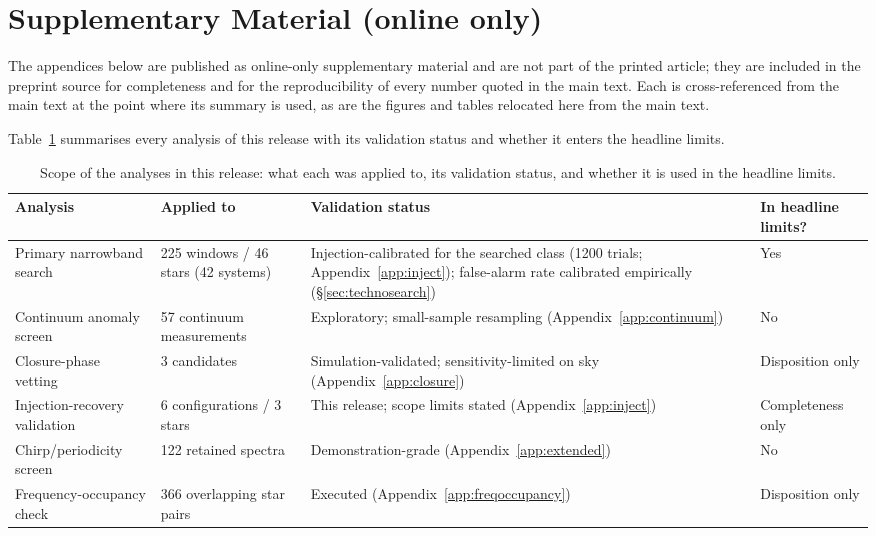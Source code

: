 \documentclass{openjournal}
\begin{document}
\clearpage
\section*{Supplementary Material (online only)}
\label{sec:supplementary}
The appendices below are published as online-only
supplementary material and are not part of the printed article; they
are included in the preprint source for completeness and for the
reproducibility of every number quoted in the main text. Each is
cross-referenced from the main text at the point where its summary
is used, as are the figures and tables relocated here from the main
text.

Table~\ref{tab:supp} summarises every analysis of this release with
its validation status and whether it enters the headline limits.


\begin{table}
\centering
\small
\caption{Scope of the analyses in this release: what each was applied
to, its validation status, and whether it is used in the headline
limits.}
\label{tab:supp}
\begin{tabular}{@{}p{}p{}p{}p{}@{}}
\toprule
Analysis & Applied to & Validation status & In headline limits? \\
\midrule
Primary narrowband search & 225 windows / 46 stars (42 systems) &
Injection-calibrated for the searched class (1200 trials;
Appendix~\ref{app:inject}); false-alarm rate calibrated empirically
(\S\ref{sec:technosearch}) & Yes \\
Continuum anomaly screen & 57 continuum measurements &
Exploratory; small-sample resampling (Appendix~\ref{app:continuum}) & No \\
Closure-phase vetting & 3 candidates & Simulation-validated;
sensitivity-limited on sky (Appendix~\ref{app:closure}) & Disposition only \\
Injection-recovery validation & 6 configurations / 3 stars &
This release; scope limits stated (Appendix~\ref{app:inject}) &
Completeness only \\
Chirp/periodicity screen & 122 retained spectra & Demonstration-grade
(Appendix~\ref{app:extended}) & No \\
Frequency-occupancy check & 366 overlapping star pairs & Executed
(Appendix~\ref{app:freqoccupancy}) & Disposition only \\
\bottomrule
\end{tabular}
\end{table}
\end{document}
